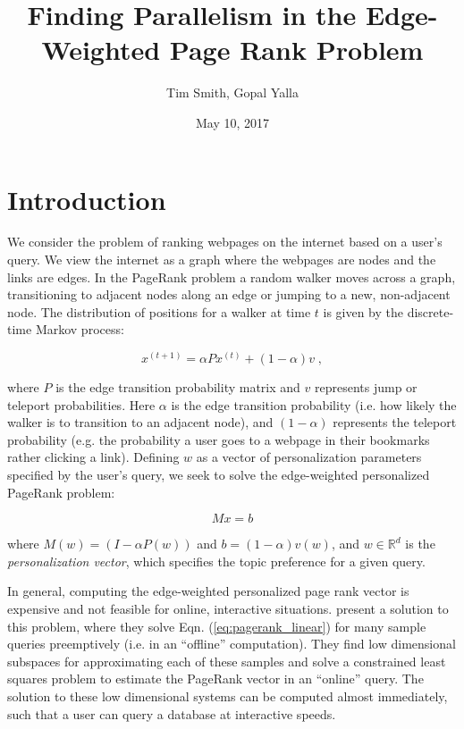 \documentclass[11pt]{article}
\title{Finding Parallelism in the Edge-Weighted Page Rank Problem}
\author{Tim Smith, Gopal Yalla}
\date{May 10, 2017}
\newcommand{\noi}{\noindent}
\begin{document}
\maketitle
\thispagestyle{empty}

\newpage
\thispagestyle{empty}
\tableofcontents
\newpage
\setcounter{page}{1}


\section{Introduction}

We consider the problem of ranking webpages on the internet based on a user's
query. We view the internet as a graph where the webpages are nodes and the
links are edges. 
In the PageRank problem a random walker moves across a graph, transitioning to
adjacent nodes along an edge or jumping to a new, non-adjacent node. The
distribution of positions for a walker at time $t$ is given by the discrete-time
Markov process: 

\begin{equation}
        x^{(t+1)}=\alpha P x^{(t)} + (1-\alpha) v \; ,
\label{eq:pagerank_markov}
\end{equation}

\noi where $P$ is the edge transition probability matrix and $v$ represents jump or
teleport probabilities. Here $\alpha$ is the edge
transition probability (i.e. how likely the walker is to transition to an
adjacent node), and $(1-\alpha)$ represents the teleport probability (e.g. the
probability a user goes to a webpage in their bookmarks rather clicking a link).
Defining $w$ as a vector of personalization parameters specified by the user's
query, we seek to solve the
edge-weighted personalized PageRank problem: 

\begin{equation}
        Mx=b
\label{eq:pagerank_linear}
\end{equation}

\noi where $M(w) = (I-\alpha P(w))$ and $b = (1-\alpha)v(w)$, and $w \in
\mathbb{R}^d$ is
the \textit{personalization vector}, which specifies the topic preference for
a given query. 

In general, computing the edge-weighted personalized page rank vector is expensive
and not feasible for online, interactive situations. \cite{xie} present a
solution to this problem, where they solve Eqn. (\ref{eq:pagerank_linear}) for many
sample queries preemptively (i.e. in an ``offline'' computation). They find low
dimensional subspaces for
approximating each of these samples and solve a constrained least squares
problem to estimate the PageRank vector in an ``online'' query. The solution to
these low dimensional systems can be computed almost immediately, such that
a user can query a database at interactive speeds.   
\end{document}
